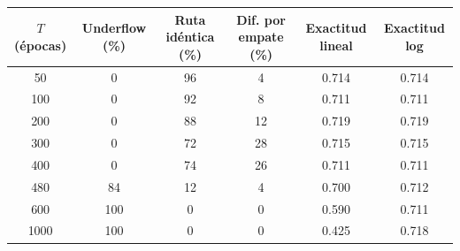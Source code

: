 \begin{tabular}{cccccc}
\toprule
\textbf{$T$ (épocas)} & \textbf{Underflow (\%)} & \textbf{Ruta idéntica (\%)} & \textbf{Dif. por empate (\%)} & \textbf{Exactitud lineal} & \textbf{Exactitud log} \\
\midrule
50 & 0 & 96 & 4 & 0.714 & 0.714 \\
100 & 0 & 92 & 8 & 0.711 & 0.711 \\
200 & 0 & 88 & 12 & 0.719 & 0.719 \\
300 & 0 & 72 & 28 & 0.715 & 0.715 \\
400 & 0 & 74 & 26 & 0.711 & 0.711 \\
480 & 84 & 12 & 4 & 0.700 & 0.712 \\
600 & 100 & 0 & 0 & 0.590 & 0.711 \\
1000 & 100 & 0 & 0 & 0.425 & 0.718 \\
\bottomrule
\end{tabular}
